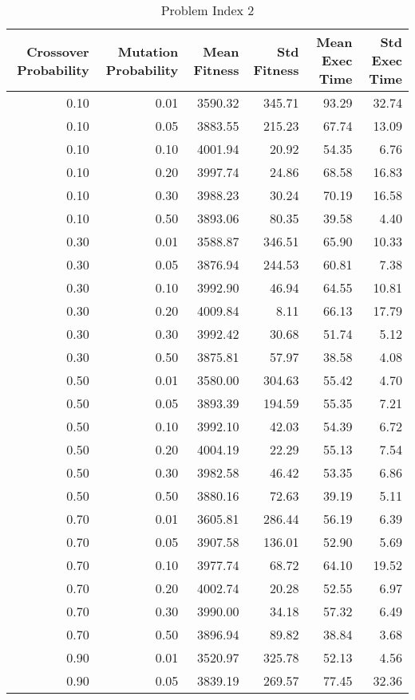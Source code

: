 \begin{table}
\caption{Problem Index 2}
\label{tab:problem_2}
\begin{tabular}{rrrrrr}
\toprule
Crossover Probability & Mutation Probability & Mean Fitness & Std Fitness & Mean Exec Time & Std Exec Time \\
\midrule
0.10 & 0.01 & 3590.32 & 345.71 & 93.29 & 32.74 \\
0.10 & 0.05 & 3883.55 & 215.23 & 67.74 & 13.09 \\
0.10 & 0.10 & 4001.94 & 20.92 & 54.35 & 6.76 \\
0.10 & 0.20 & 3997.74 & 24.86 & 68.58 & 16.83 \\
0.10 & 0.30 & 3988.23 & 30.24 & 70.19 & 16.58 \\
0.10 & 0.50 & 3893.06 & 80.35 & 39.58 & 4.40 \\
0.30 & 0.01 & 3588.87 & 346.51 & 65.90 & 10.33 \\
0.30 & 0.05 & 3876.94 & 244.53 & 60.81 & 7.38 \\
0.30 & 0.10 & 3992.90 & 46.94 & 64.55 & 10.81 \\
0.30 & 0.20 & 4009.84 & 8.11 & 66.13 & 17.79 \\
0.30 & 0.30 & 3992.42 & 30.68 & 51.74 & 5.12 \\
0.30 & 0.50 & 3875.81 & 57.97 & 38.58 & 4.08 \\
0.50 & 0.01 & 3580.00 & 304.63 & 55.42 & 4.70 \\
0.50 & 0.05 & 3893.39 & 194.59 & 55.35 & 7.21 \\
0.50 & 0.10 & 3992.10 & 42.03 & 54.39 & 6.72 \\
0.50 & 0.20 & 4004.19 & 22.29 & 55.13 & 7.54 \\
0.50 & 0.30 & 3982.58 & 46.42 & 53.35 & 6.86 \\
0.50 & 0.50 & 3880.16 & 72.63 & 39.19 & 5.11 \\
0.70 & 0.01 & 3605.81 & 286.44 & 56.19 & 6.39 \\
0.70 & 0.05 & 3907.58 & 136.01 & 52.90 & 5.69 \\
0.70 & 0.10 & 3977.74 & 68.72 & 64.10 & 19.52 \\
0.70 & 0.20 & 4002.74 & 20.28 & 52.55 & 6.97 \\
0.70 & 0.30 & 3990.00 & 34.18 & 57.32 & 6.49 \\
0.70 & 0.50 & 3896.94 & 89.82 & 38.84 & 3.68 \\
0.90 & 0.01 & 3520.97 & 325.78 & 52.13 & 4.56 \\
0.90 & 0.05 & 3839.19 & 269.57 & 77.45 & 32.36 \\

\end{tabular}
\end{table}
